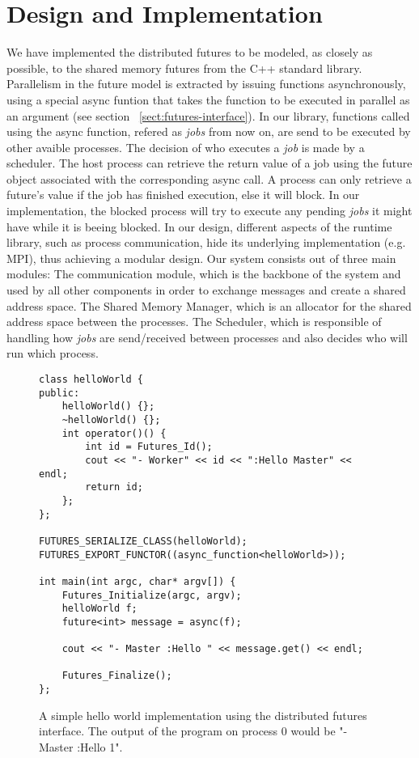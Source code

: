 \chapter{Design and Implementation}

We have implemented the distributed futures to be modeled, as closely as possible, 
to the shared memory futures from the C++ standard library.  Parallelism in the future
model is extracted by issuing functions asynchronously, using a special async funtion
that takes the function to be executed in parallel as an argument (see section ~\ref{sect:futures-interface}).
In our library, functions called using the async function,
refered as \emph{jobs} from now on, are send to be executed by other avaible processes.  
The decision of who executes a \emph{job} is made by a scheduler.  The host process can retrieve
the return value of a job using the future object associated with the corresponding async call.
A process can only retrieve a future's value if the job has finished execution, else it will block.
In our implementation, the blocked process will try to execute any pending \emph{jobs} it might have
while it is beeing blocked.  In our design, different aspects of the runtime library, such as process
communication, hide its underlying implementation (e.g. MPI),  thus achieving a modular design.
Our system consists out of three main modules: 
The communication module, which is the backbone of the system
and used by all other components in order to exchange messages and create a shared address space. 
The Shared Memory Manager, which is an allocator for the shared address space between the processes.
The Scheduler, which is responsible of handling how \emph{jobs} are send/received between processes
and also decides who will run which process.

\begin{figure}[here]
\begin{lstlisting}
class helloWorld {
public:
	helloWorld() {};
	~helloWorld() {};
	int operator()() { 
		int id = Futures_Id();
		cout << "- Worker" << id << ":Hello Master" << endl;
		return id;
	};
};

FUTURES_SERIALIZE_CLASS(helloWorld);
FUTURES_EXPORT_FUNCTOR((async_function<helloWorld>));

int main(int argc, char* argv[]) {
	Futures_Initialize(argc, argv);
	helloWorld f;
	future<int> message = async(f);

	cout << "- Master :Hello " << message.get() << endl;

	Futures_Finalize();
};
\end{lstlisting}
\caption{
A simple hello world implementation using the distributed futures interface.  
The output of the program on process 0 would be "- Master :Hello 1".}
\label{lst:hello}
\end{figure}

